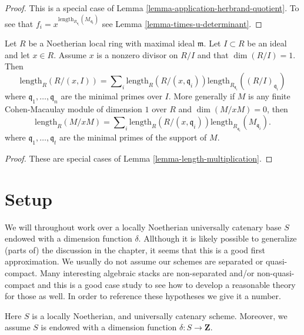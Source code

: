 \begin{proof}
This is a special case of Lemma \ref{lemma-application-herbrand-quotient}.
To see that $f_i = x^{\text{length}_{R_{\mathfrak q_i}}(M_{\mathfrak q_i})}$
see Lemma \ref{lemma-times-u-determinant}.
\end{proof}

\begin{lemma}
\label{lemma-additivity-divisors-restricted}
Let $R$ be a Noetherian local ring with maximal ideal $\mathfrak m$.
Let $I \subset R$ be an ideal and let $x \in R$.
Assume $x$ is a nonzero divisor on $R/I$ and that $\dim(R/I) = 1$.
Then
$$
\text{length}_R(R/(x, I))
=
\sum\nolimits_i \text{length}_R(R/(x, \mathfrak q_i))
\text{length}_{R_{\mathfrak q_i}}((R/I)_{\mathfrak q_i})
$$
where $\mathfrak q_1, \ldots, \mathfrak q_n$ are the minimal
primes over $I$. More generally if $M$ is any finite Cohen-Macaulay
module of dimension $1$ over $R$ and $\dim(M/xM) = 0$, then
$$
\text{length}_R(M/xM)
=
\sum\nolimits_i \text{length}_R(R/(x, \mathfrak q_i))
\text{length}_{R_{\mathfrak q_i}}(M_{\mathfrak q_i}).
$$
where $\mathfrak q_1, \ldots, \mathfrak q_t$ are the
minimal primes of the support of $M$.
\end{lemma}

\begin{proof}
These are special cases of Lemma \ref{lemma-length-multiplication}.
\end{proof}





\section{Setup}
\label{section-setup}

\noindent
We will throughout work over a locally Noetherian universally
catenary base $S$ endowed with a dimension function $\delta$.
Allthough it is likely possible to generalize (parts of) the
discussion in the chapter, it seems that this is a good first
approximation. We usually do not assume our schemes are
separated or quasi-compact. Many interesting algebraic stacks
are non-separated and/or non-quasi-compact and this is a good
case study to see how to develop a reasonable theory for those as well.
In order to reference these hypotheses we give it a number.

\begin{situation}
\label{situation-setup}
Here $S$ is a locally Noetherian, and universally catenary scheme.
Moreover, we assume $S$ is endowed with a dimension function
$\delta : S \longrightarrow \mathbf{Z}$.
\end{situation}

